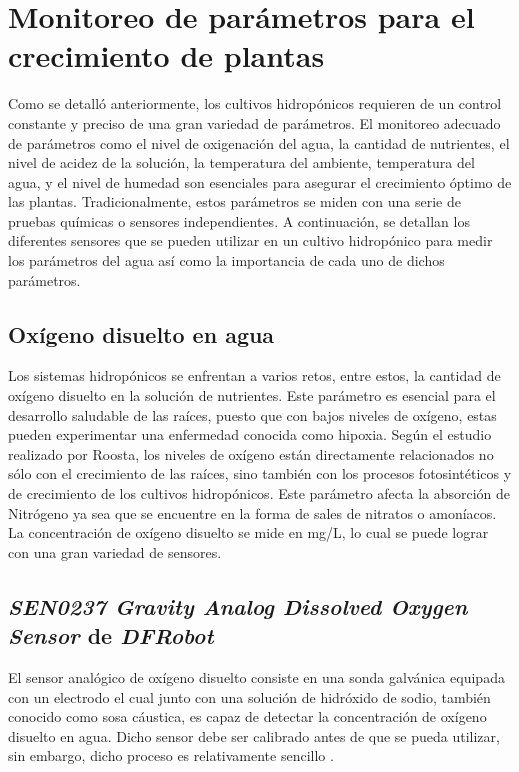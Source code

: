 \section{Monitoreo de parámetros para el crecimiento de plantas}
Como se detalló anteriormente, los cultivos hidropónicos requieren de un control constante y preciso de una gran variedad de parámetros. El monitoreo adecuado de parámetros como el nivel de oxigenación del agua, la cantidad de nutrientes, el nivel de acidez de la solución, la temperatura del ambiente, temperatura del agua, y el nivel de humedad son esenciales para asegurar el crecimiento óptimo de las plantas. Tradicionalmente, estos parámetros se miden con una serie de pruebas químicas o sensores independientes. A continuación, se detallan los diferentes sensores que se pueden utilizar en un cultivo hidropónico para medir los parámetros del agua así como la importancia de cada uno de dichos parámetros.

\subsection{Oxígeno disuelto en agua}
Los sistemas hidropónicos se enfrentan a varios retos, entre estos, la cantidad de oxígeno disuelto en la solución de nutrientes. Este parámetro es esencial para el desarrollo saludable de las raíces, puesto que con bajos niveles de oxígeno, estas pueden experimentar una enfermedad conocida como hipoxia. Según el estudio realizado por Roosta, los niveles de oxígeno están directamente relacionados no sólo con el crecimiento de las raíces, sino también con los procesos fotosintéticos y de crecimiento de los cultivos hidropónicos. Este parámetro afecta la absorción de Nitrógeno ya sea que se encuentre en la forma de sales de nitratos o amoníacos\cite{roosta_responses_2024}. La concentración de oxígeno disuelto se mide en mg/L, lo cual se puede lograr con una gran variedad de sensores.

\subsection{\textit{SEN0237 Gravity Analog Dissolved Oxygen Sensor} de \textit{DFRobot}}
El sensor analógico de oxígeno disuelto consiste en una sonda galvánica equipada con un electrodo el cual junto con una solución de hidróxido de sodio, también conocido como sosa cáustica, es capaz de detectar la concentración de oxígeno disuelto en agua. Dicho sensor debe ser calibrado antes de que se pueda utilizar, sin embargo, dicho proceso es relativamente sencillo \cite{DFRobot_DOsensor}. 

